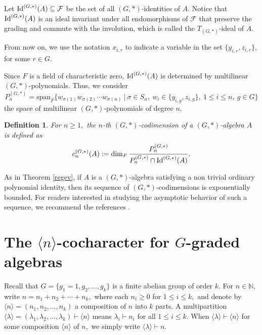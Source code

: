 \documentclass{amsart}
\newcommand{\IdG}{\ensuremath{\textnormal{Id}^{(G,\ast)}}}
\newtheorem{definicao}[teorema]{Definition}
\numberwithin{equation}{section}
\begin{document}
Let $\IdG(A) \subseteq \mathcal{F}$   be the set of all $(G,*)$-identities of $A.$
Notice that $\IdG(A)$ is an ideal invariant
under all endomorphisms of $\mathcal{F}$ that preserve the grading and commute with the involution, which is called
the $T_{(G,*)}$-ideal of $A.$ 

From now on, we use the notation $x_{i,r}$ to indicate a variable in the set $\{y_{i,r}, z_{i,r}\},$ for some $r \in G.$




Since $F$ is a field of characteristic zero, $\IdG(A)$ is determined by 
multilinear $(G,*)$-polynomials. Thus, we consider
$$P_n^{(G,*)}=\mbox{span}_F\{w_{\sigma(1)}w_{\sigma(2)}\cdots w_{\sigma(n)}~|~ \sigma \in S_n,~ w_i \in \{y_{i,g}, z_{i,g}\}, ~1 \le i \le n, ~g \in G\}$$ 
the space of multilinear $(G,*)$-polynomials of degree $n.$ 

\begin{definicao}
    For $n\ge 1,$ the $n$-th $(G,*)$-codimension of a $(G,*)$-algebra $A$ is defined as $$c_n^{(G,*)}(A):=\dim_F\frac{P_n^{(G,*)}}{P_n^{(G,*)}\cap \IdG(A)}. $$ 
\end{definicao}

As in Theorem \ref{regev}, if $A$ is a $(G,\ast)$-algebra satisfying a non trivial ordinary polynomial identity, then its sequence of $(G, *)$-codimensions is exponentially bounded. 
 For readers interested in studying the asymptotic behavior of such a sequence, we recommend the references \cite{Mara, OSV, Lorena}. 






\section{ The $\langle n \rangle$-cocharacter for $G$-graded algebras} 

Recall that $G=\{g_1=1,g_2,\ldots,g_k\}$ is a finite abelian group of order $k$. For  $n \in \mathbb{N},$ write $n=n_1+n_2+\cdots+n_{k},$ where each $n_i\ge 0$  for $1\le i \le k,$ and  denote by $\langle n \rangle =(n_1, n_2, \ldots, n_{k})$ a composition of $n$ into $k$ parts. A multipartition $\langle \lambda \rangle=(\lambda_1, \lambda_2, \ldots, \lambda_{k})\vdash \langle n \rangle$ means $\lambda_i\vdash n_i$ for all $1 \le i\le k.$ When $\langle \lambda \rangle \vdash \langle n \rangle$ for some composition  $\langle n \rangle$ of $n,$  we simply write $\langle \lambda \rangle \vdash n.$ 
\end{document}

